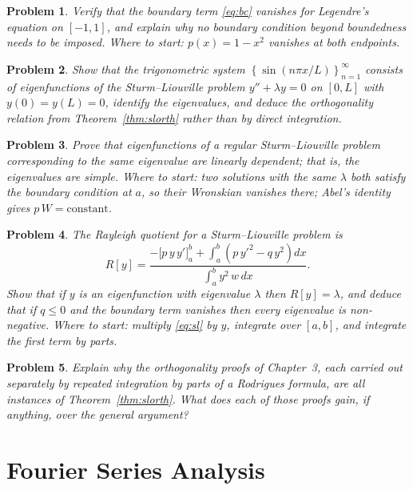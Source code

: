 \documentclass[12pt,a4paper]{report}
\theoremstyle{definition}
\theoremstyle{plain}
\newtheorem{problemx}{Problem}[section]
\newenvironment{problem}{\begin{problemx}}{\end{problemx}}
\begin{document}
\begin{problem}
Verify that the boundary term \eqref{eq:bc} vanishes for Legendre's equation on
$[-1,1]$, and explain why no boundary condition beyond boundedness needs to be
imposed.
\emph{Where to start: $p(x)=1-x^{2}$ vanishes at both endpoints.}
\end{problem}

\begin{problem}
Show that the trigonometric system
$\left\{\sin\left(n\pi x/L\right)\right\}^{\infty}_{n=1}$ consists of
eigenfunctions of the Sturm--Liouville problem $y''+\lambda y = 0$ on $[0,L]$
with $y(0)=y(L)=0$, identify the eigenvalues, and deduce the orthogonality
relation from Theorem~\ref{thm:slorth} rather than by direct integration.
\end{problem}

\begin{problem}
Prove that eigenfunctions of a regular Sturm--Liouville problem corresponding to
the same eigenvalue are linearly dependent; that is, the eigenvalues are simple.
\emph{Where to start: two solutions with the same $\lambda$ both satisfy the
boundary condition at $a$, so their Wronskian vanishes there; Abel's identity
gives $p\,W = \text{constant}$.}
\end{problem}

\begin{problem}
The \emph{Rayleigh quotient} for a Sturm--Liouville problem is
$$R[y] = \frac{\displaystyle -\Big[p\,y\,y'\Big]^{b}_{a}
+ \int^{b}_{a}\left(p\,y'^{2}-q\,y^{2}\right)dx}
{\displaystyle\int^{b}_{a}y^{2}\,w\,dx}.$$
Show that if $y$ is an eigenfunction with eigenvalue $\lambda$ then
$R[y]=\lambda$, and deduce that if $q\leq0$ and the boundary term vanishes then
every eigenvalue is non-negative.
\emph{Where to start: multiply \eqref{eq:sl} by $y$, integrate over $[a,b]$, and
integrate the first term by parts.}
\end{problem}

\begin{problem}
Explain why the orthogonality proofs of Chapter~3, each carried out separately
by repeated integration by parts of a Rodrigues formula, are all instances of
Theorem~\ref{thm:slorth}. What does each of those proofs gain, if anything, over
the general argument?
\end{problem}


\chapter{Fourier Series Analysis}
\vspace*{-7mm}
\end{document}
